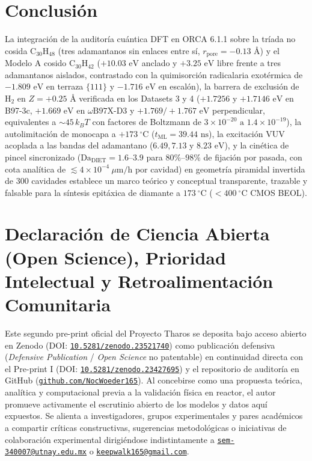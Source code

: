 \documentclass[10pt,twocolumn,a4paper]{article}
\begin{document}
\section{Conclusión}
La integración de la auditoría cuántica DFT en ORCA 6.1.1 sobre la tríada no cosida $\text{C}_{30}\text{H}_{48}$ (tres adamantanos sin enlaces entre sí, $r_{\text{pore}} = -0.13\text{ \AA}$) y el Modelo A cosido $\text{C}_{30}\text{H}_{42}$ ($+10.03\text{ eV}$ anclado y $+3.25\text{ eV}$ libre frente a tres adamantanos aislados, contrastado con la quimisorción radicalaria exotérmica de $-1.809\text{ eV}$ en terraza $\{111\}$ y $-1.716\text{ eV}$ en escalón), la barrera de exclusión de $\text{H}_2$ en $Z = +0.25\text{ \AA}$ verificada en los Datasets 3 y 4 ($+1.7256$ y $+1.7146\text{ eV}$ en B97-3c, $+1.669\text{ eV}$ en $\omega\text{B97X-D3}$ y $+1.769 / +1.767\text{ eV}$ perpendicular, equivalentes a $\sim 45\,k_B T$ con factores de Boltzmann de $3 \times 10^{-20}\text{ a }1.4 \times 10^{-19}$), la autolimitación de monocapa a $+173\ ^\circ\text{C}$ ($t_{\text{ML}} = 39.44\text{ ns}$), la excitación VUV acoplada a las bandas del adamantano ($6.49, 7.13$ y $8.23\text{ eV}$), y la cinética de pincel sincronizado ($\text{Da}_{\text{DIET}} = 1.6\text{--}3.9$ para $80\%\text{--}98\%$ de fijación por pasada, con cota analítica de $\lesssim 4 \times 10^{-4}\ \mu\text{m/h}$ por cavidad) en geometría piramidal invertida de $300$ cavidades establece un marco teórico y conceptual transparente, trazable y falsable para la síntesis epitáxica de diamante a $173\ ^\circ\text{C}$ ($<400\ ^\circ\text{C}$ CMOS BEOL).

\section*{Declaración de Ciencia Abierta (Open Science), Prioridad Intelectual y Retroalimentación Comunitaria}
Este segundo pre-print oficial del Proyecto Tharos se deposita bajo acceso abierto en Zenodo (DOI: \href{https://doi.org/10.5281/zenodo.23521740}{\texttt{10.5281/zenodo.23521740}}) como publicación defensiva (\textit{Defensive Publication} / \textit{Open Science} no patentable) en continuidad directa con el Pre-print I (DOI: \href{https://doi.org/10.5281/zenodo.23427695}{\texttt{10.5281/zenodo.23427695}}) y el repositorio de auditoría en GitHub (\href{https://github.com/NocWoeder165}{\texttt{github.com/NocWoeder165}}). Al concebirse como una propuesta teórica, analítica y computacional previa a la validación física en reactor, el autor promueve activamente el escrutinio abierto de los modelos y datos aquí expuestos. Se alienta a investigadores, grupos experimentales y pares académicos a compartir críticas constructivas, sugerencias metodológicas o iniciativas de colaboración experimental dirigiéndose indistintamente a \href{mailto:sem-340007@utnay.edu.mx}{\texttt{sem-340007@utnay.edu.mx}} o \href{mailto:keepwalk165@gmail.com}{\texttt{keepwalk165@gmail.com}}.
\end{document}
